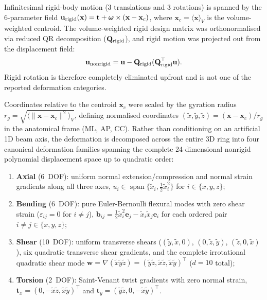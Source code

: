 \documentclass[11pt]{article}
\begin{document}
Infinitesimal rigid-body motion (3 translations and 3 rotations) is spanned by the 6-parameter field $\mathbf u_{\rm rigid}(\mathbf x)=\mathbf t+\boldsymbol\omega\times(\mathbf x-\mathbf x_c)$, where $\mathbf x_c=\langle\mathbf x\rangle_V$ is the volume-weighted centroid.
The volume-weighted rigid design matrix was orthonormalised via reduced QR decomposition ($\mathbf Q_{\rm rigid}$), and rigid motion was projected out from the displacement field:
\begin{equation}
\mathbf u_{\rm nonrigid} = \mathbf u - \mathbf Q_{\rm rigid}(\mathbf Q_{\rm rigid}^\top \mathbf u).
\end{equation}
Rigid rotation is therefore completely eliminated upfront and is not one of the reported deformation categories.

Coordinates relative to the centroid $\mathbf x_c$ were scaled by the gyration radius $r_g = \sqrt{\langle \|\mathbf x - \mathbf x_c\|^2 \rangle_V}$, defining normalised coordinates $(\tilde x, \tilde y, \tilde z) = (\mathbf x - \mathbf x_c)/r_g$ in the anatomical frame (ML, AP, CC).
Rather than conditioning on an artificial 1D beam axis, the deformation is decomposed across the entire 3D ring into four canonical deformation families spanning the complete 24-dimensional nonrigid polynomial displacement space up to quadratic order:
\begin{enumerate}[label=(\roman*)]
\item \textbf{Axial} (6~DOF): uniform normal extension/compression and normal strain gradients along all three axes,
$u_i \in \operatorname{span}\{\tilde x_i, \tfrac12 \tilde x_i^2\}$ for $i \in \{x, y, z\}$;
\item \textbf{Bending} (6~DOF): pure Euler-Bernoulli flexural modes with zero shear strain ($\varepsilon_{ij} = 0$ for $i \ne j$),
$\mathbf b_{ij} = \tfrac12 \tilde x_i^2 \mathbf e_j - \tilde x_i \tilde x_j \mathbf e_i$ for each ordered pair $i \ne j \in \{x, y, z\}$;
\item \textbf{Shear} (10~DOF): uniform transverse shears ($( \tilde y, \tilde x, 0 )$, $( 0, \tilde z, \tilde y )$, $( \tilde z, 0, \tilde x )$), six quadratic transverse shear gradients, and the complete irrotational quadratic shear mode $\mathbf w = \nabla(\tilde x \tilde y \tilde z) = (\tilde y \tilde z, \tilde x \tilde z, \tilde x \tilde y)^\top$ ($d=10$ total);
\item \textbf{Torsion} (2~DOF): Saint-Venant twist gradients with zero normal strain,
$\mathbf t_x = (0, -\tilde x \tilde z, \tilde x \tilde y)^\top$ and $\mathbf t_y = (\tilde y \tilde z, 0, -\tilde x \tilde y)^\top$.
\end{enumerate}
\end{document}
